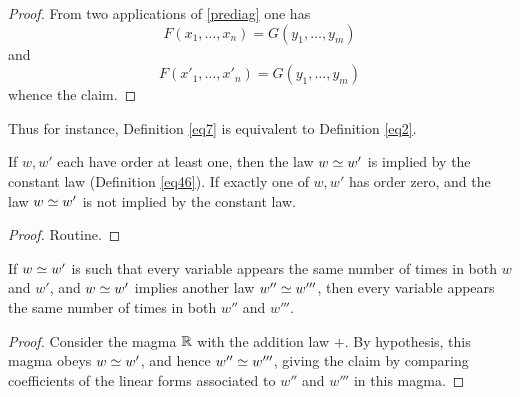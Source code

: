 \begin{proof}  From two applications of \eqref{prediag} one has
$$ F(x_1,\dots,x_n) = G(y_1,\dots,y_m)$$
and
$$ F(x'_1,\dots,x'_n) = G(y_1,\dots,y_m)$$
whence the claim.
\end{proof}

Thus for instance, Definition \ref{eq7} is equivalent to Definition \ref{eq2}.

\begin{theorem}\label{constant-impl}  If $w, w'$ each have order at least one, then the law $w \simeq w'$ is implied by the constant law (Definition \ref{eq46}).  If exactly one of $w, w'$ has order zero, and the law $w \simeq w'$ is not implied by the constant law.
\end{theorem}

\begin{proof} Routine.
\end{proof}

\begin{theorem}\label{variable-impl}  If $w \simeq w'$ is such that every variable appears the same number of times in both $w$ and $w'$, and $w \simeq w'$ implies another law $w'' \simeq w'''$, then every variable appears the same number of times in both $w''$ and $w'''$.
\end{theorem}

\begin{proof} Consider the magma $\mathbb{R}$ with the addition law $+$.  By hypothesis, this magma obeys $w \simeq w'$, and hence $w'' \simeq w'''$, giving the claim by comparing coefficients of the linear forms associated to $w''$ and $w'''$ in this magma.
\end{proof}
